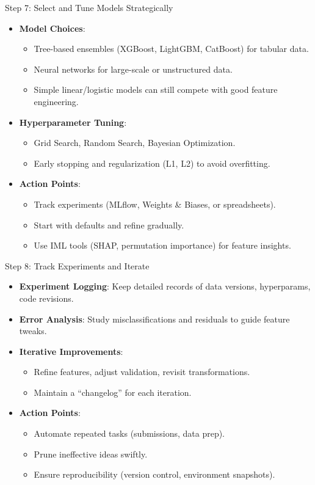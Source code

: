 \documentclass[ignorenonframetext,]{beamer}
\begin{document}
\begin{frame}{Step 7: Select and Tune Models Strategically}
\begin{itemize}
  \item \textbf{Model Choices}:
    \begin{itemize}
      \item Tree-based ensembles (XGBoost, LightGBM, CatBoost) for tabular data.
      \item Neural networks for large-scale or unstructured data.
      \item Simple linear/logistic models can still compete with good feature engineering.
    \end{itemize}
  \item \textbf{Hyperparameter Tuning}:
    \begin{itemize}
      \item Grid Search, Random Search, Bayesian Optimization.
      \item Early stopping and regularization (L1, L2) to avoid overfitting.
    \end{itemize}
  \item \textbf{Action Points}:
    \begin{itemize}
      \item Track experiments (MLflow, Weights \& Biases, or spreadsheets).
      \item Start with defaults and refine gradually.
      \item Use IML tools (SHAP, permutation importance) for feature insights.
    \end{itemize}
\end{itemize}
\end{frame}

\begin{frame}{Step 8: Track Experiments and Iterate}
\begin{itemize}
  \item \textbf{Experiment Logging}: Keep detailed records of data versions, hyperparams, code revisions.
  \item \textbf{Error Analysis}: Study misclassifications and residuals to guide feature tweaks.
  \item \textbf{Iterative Improvements}:
    \begin{itemize}
      \item Refine features, adjust validation, revisit transformations.
      \item Maintain a “changelog” for each iteration.
    \end{itemize}
  \item \textbf{Action Points}:
    \begin{itemize}
      \item Automate repeated tasks (submissions, data prep).
      \item Prune ineffective ideas swiftly.
      \item Ensure reproducibility (version control, environment snapshots).
    \end{itemize}
\end{itemize}
\end{frame}
\end{document}
